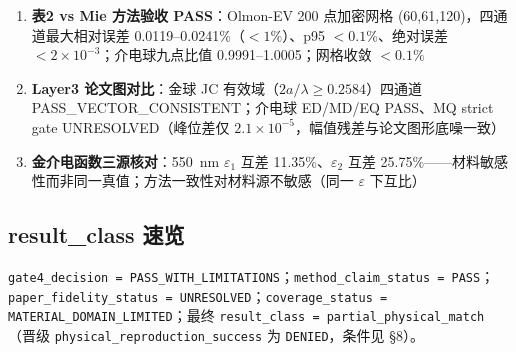 \begin{enumerate}
  \item \textbf{表2 vs Mie 方法验收 PASS}：Olmon-EV 200 点加密网格 (60,61,120)，四通道最大相对误差 0.0119--0.0241\%（$<1\%$）、p95 $<0.1\%$、绝对误差 $<2\times10^{-3}$；介电球九点比值 0.9991--1.0005；网格收敛 $<0.1\%$
  \item \textbf{Layer3 论文图对比}：金球 JC 有效域（$2a/\lambda\geq0.2584$）四通道 PASS\_VECTOR\_CONSISTENT；介电球 ED/MD/EQ PASS、MQ strict gate UNRESOLVED（峰位差仅 $2.1\times10^{-5}$，幅值残差与论文图形底噪一致）
  \item \textbf{金介电函数三源核对}：550~nm $\varepsilon_1$ 互差 11.35\%、$\varepsilon_2$ 互差 25.75\%——材料敏感性而非同一真值；方法一致性对材料源不敏感（同一 $\varepsilon$ 下互比）
\end{enumerate}

\subsection{result\_class 速览}

\texttt{gate4\_decision = PASS\_WITH\_LIMITATIONS}；\texttt{method\_claim\_status = PASS}；\texttt{paper\_fidelity\_status = UNRESOLVED}；\texttt{coverage\_status = MATERIAL\_DOMAIN\_LIMITED}；最终 \texttt{result\_class = partial\_physical\_match}（晋级 \texttt{physical\_reproduction\_success} 为 \texttt{DENIED}，条件见 §8）。
